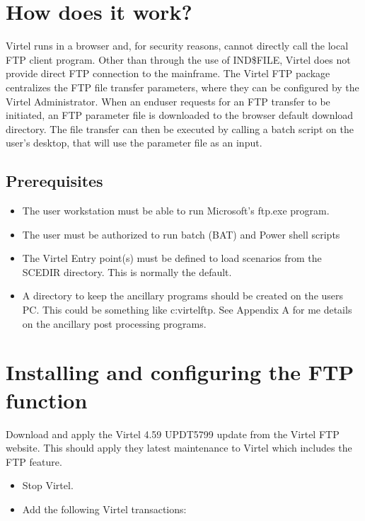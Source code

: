 \documentclass[letterpaper,10pt,english]{sphinxmanual}
\begin{document}
\section{How does it work?}
\label{\detokenize{Customization:how-does-it-work}}
\sphinxAtStartPar
Virtel runs in a browser and, for security reasons, cannot directly call the local FTP client program. Other than through the use of IND\$FILE, Virtel does not provide direct FTP connection to the mainframe. The Virtel FTP package centralizes the FTP file transfer parameters, where they can be configured by the Virtel Administrator. When an end\sphinxhyphen{}user requests for an FTP transfer to be initiated, an FTP parameter file is downloaded to the browser default download directory. The file transfer can then be executed by calling a batch script on the user’s desktop, that will use the parameter file as an input.


\subsection{Pre\sphinxhyphen{}requisites}
\label{\detokenize{Customization:pre-requisites}}\begin{itemize}
\item {} 
\sphinxAtStartPar
The user workstation must be able to run Microsoft’s ftp.exe program.

\item {} 
\sphinxAtStartPar
The user must be authorized to run batch (BAT) and Power shell scripts

\item {} 
\sphinxAtStartPar
The Virtel Entry point(s) must be defined to load scenarios from the SCE\sphinxhyphen{}DIR directory. This is normally the default.

\item {} 
\sphinxAtStartPar
A directory to keep the ancillary programs should be created on the users PC. This could be something like c:virtelftp. See Appendix A for me details on the ancillary post processing programs.

\end{itemize}


\section{Installing and configuring the FTP function}
\label{\detokenize{Customization:installing-and-configuring-the-ftp-function}}
\sphinxAtStartPar
Download and apply the Virtel 4.59 UPDT5799 update from the Virtel FTP website. This should apply they latest maintenance to Virtel which includes the FTP feature.
\begin{itemize}
\item {} 
\sphinxAtStartPar
Stop Virtel.

\item {} 
\sphinxAtStartPar
Add the following Virtel transactions: \sphinxhyphen{}

\end{itemize}
\end{document}
